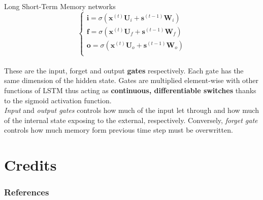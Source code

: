 \documentclass[aspectratio=169]{beamer}
\begin{document}
\begin{frame}{Long Short-Term Memory networks}
\begin{equation}
	\begin{cases}
	\bm{i} = \sigma(\bm{x}^{(t)}\bm{U}_{i} + \bm{s}^{(t-1)}\bm{W}_{i})\\
	\bm{f} = \sigma(\bm{x}^{(t)}\bm{U}_{f} + \bm{s}^{(t-1)}\bm{W}_{f})\\
	\bm{o} = \sigma(\bm{x}^{(t)}\bm{U}_{o} + \bm{s}^{(t-1)}\bm{W}_{o})\\
	\end{cases}
\end{equation}\\
\vspace{0.3cm}
These are the input, forget and output \textbf{gates} respectively. Each gate has the same dimension of the hidden state. Gates are multiplied element-wise with other functions of LSTM thus acting as \textbf{continuous, differentiable switches} thanks to the sigmoid activation function.\\
\vspace{0.3cm}
\textit{Input} and \textit{output gates} controls how much of the input let through and how much of the internal state exposing to the external, respectively.	Conversely, \textit{forget gate} controls how much memory form previous time step must be overwritten.

\end{frame}


\section{Credits}



\begin{frame}[t, allowframebreaks]
\frametitle{References}


\end{frame}
\end{document}
